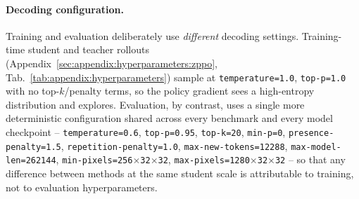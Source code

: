 \begin{table}[!htbp]
    \centering
    \caption{5 Video benchmarks (Tab.~\ref{tab:generalization}, Video block).}
    \label{tab:appendix:video_benchmarks}
\end{table}

\paragraph{Decoding configuration.}
Training and evaluation deliberately use \emph{different} decoding settings. Training-time student and teacher rollouts (Appendix~\ref{sec:appendix:hyperparameters:zppo}, Tab.~\ref{tab:appendix:hyperparameters}) sample at \texttt{temperature=1.0}, \texttt{top-p=1.0} with no top-$k$/penalty terms, so the policy gradient sees a high-entropy distribution and explores. Evaluation, by contrast, uses a single more deterministic configuration shared across every benchmark and every model checkpoint -- \texttt{temperature=0.6}, \texttt{top-p=0.95}, \texttt{top-k=20}, \texttt{min-p=0}, \texttt{presence-penalty=1.5}, \texttt{repetition-penalty=1.0}, \texttt{max-new-tokens=12288}, \texttt{max-model-len=262144}, \texttt{min-pixels=256$\times$32$\times$32}, \texttt{max-pixels=1280$\times$32$\times$32} -- so that any difference between methods at the same student scale is attributable to training, not to evaluation hyperparameters.

